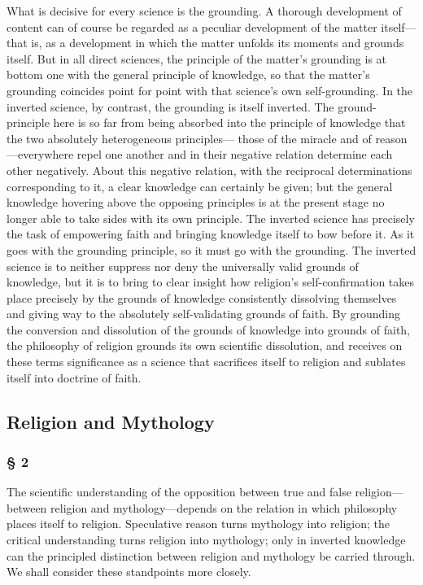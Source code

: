 \documentclass[12pt,a4paper]{article}
\begin{document}
What is decisive for every science is the grounding. A thorough
development of content can of course be regarded as a peculiar
development of the matter itself---that is, as a development in
which the matter unfolds its moments and grounds itself. But in
all direct sciences, the principle of the matter's grounding is
at bottom one with the general principle of knowledge, so that
the matter's grounding coincides point for point with that
science's own self-grounding. In the inverted science, by
contrast, the grounding is itself inverted. The ground-principle
here is so far from being absorbed into the principle of
knowledge that the two absolutely heterogeneous principles---
those of the miracle and of reason---everywhere repel one
another and in their negative relation determine each other
negatively. About this negative relation, with the reciprocal
determinations corresponding to it, a clear knowledge can
certainly be given; but the general knowledge hovering above the
opposing principles is at the present stage no longer able to
take sides with its own principle. The inverted science has
precisely the task of empowering faith and bringing knowledge
itself to bow before it. As it goes with the grounding
principle, so it must go with the grounding. The inverted
science is to neither suppress nor deny the universally valid
grounds of knowledge, but it is to bring to clear insight how
religion's self-confirmation takes place precisely by the
grounds of knowledge consistently dissolving themselves and
giving way to the absolutely self-validating grounds of faith.
By grounding the conversion and dissolution of the grounds of
knowledge into grounds of faith, the philosophy of religion
grounds its own scientific dissolution, and receives on these
terms significance as a science that sacrifices itself to
religion and sublates itself into doctrine of faith.

\subsection*{Religion and Mythology}
\subsubsection*{§ 2}

The scientific understanding of the opposition between true and
false religion---between religion and mythology---depends on the
relation in which philosophy places itself to religion.
Speculative reason turns mythology into religion; the critical
understanding turns religion into mythology; only in inverted
knowledge can the principled distinction between religion and
mythology be carried through. We shall consider these
standpoints more closely.
\end{document}
